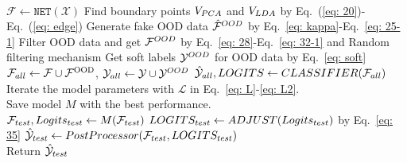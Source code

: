 \documentclass{article}
\theoremstyle{plain}
\theoremstyle{definition}
\theoremstyle{remark}
\begin{document}
\begin{algorithm}[!t]
    \caption{GROD}
    \small
    \label{algorithm-grod}
    \begin{algorithmic}
         \\
            \STATE $\mathcal{F} \gets \texttt{NET}(\mathcal{X})$ 
             \STATE Find boundary points $V_{\rm PCA}$ and $V_{\rm LDA}$ by Eq.~(\ref{eq: 20})-Eq.~(\ref{eq: edge})
             \STATE Generate fake OOD data $\hat{\mathcal{F}}^{\rm OOD}$ by Eq.~\eqref{eq: kappa}-Eq.~\eqref{eq: 25-1}
             \STATE Filter OOD data and get $\mathcal{F}^{\rm OOD}$ by Eq.~\eqref{eq: 28}-Eq.~\eqref{eq: 32-1} and Random filtering mechanism
             \STATE Get soft labels $\mathcal{Y}^{\rm OOD}$ for OOD data by Eq.~\eqref{eq: soft}
             \STATE $\mathcal{F}_{\rm all}\gets \mathcal{F}\cup \mathcal{F}^{\text{OOD}}$, $\mathcal{Y}_{\rm all}\gets \mathcal{Y}\cup \mathcal{Y}^{\rm OOD}$
             \STATE $\hat{\mathcal{Y}}_{\rm all}, \textsc{LOGITS}\gets \texttt{CLASSIFIER}(\mathcal{F}_{\rm all})$
             \STATE Iterate the model parameters with $\mathcal{L}$ in Eq.~\eqref{eq: L}-\eqref{eq: L2}.             
             \ENDFOR \\
            Save model $M$ with the best performance.
    \ENDFOR \\
    \STATE $\mathcal{F}_{\rm test},\textsc{Logits}_{\rm test}\gets M(\mathcal{F}_{\rm test})$
    \STATE $\textsc{LOGITS}_{\rm test} \gets \texttt{ADJUST}(\textsc{Logits}_{\rm test})$ by Eq.~\eqref{eq: 35}
    \STATE $\hat{\mathcal{Y}}_{\rm test}\gets \texttt{PostProcessor}(\mathcal{F}_{\rm test}, \textsc{LOGITS}_{\rm test})$ \\
    Return $\hat{\mathcal{Y}}_{\rm test}$
    \end{algorithmic}
    
\end{algorithm}
\end{document}
